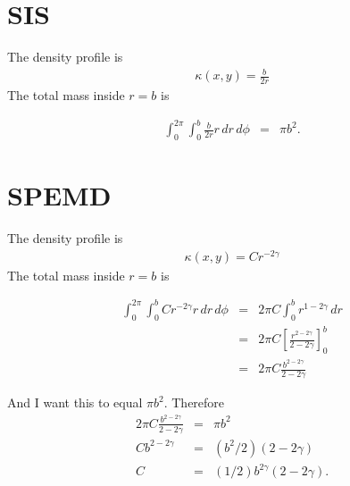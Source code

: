 \documentclass[a4paper, 11pt]{article}
\title{}
\author{}
\begin{document}

\section*{SIS}

The density profile is
\begin{eqnarray}
\kappa(x, y) = \frac{b}{2r}
\end{eqnarray}
The total mass inside $r=b$ is

\begin{eqnarray}
\int_0^{2\pi}\int_0^b \frac{b}{2r} r \, dr \, d\phi
&=& \pi b^2.
\end{eqnarray}

\section*{SPEMD}
The density profile is
\begin{eqnarray}
\kappa(x, y) = Cr^{-2\gamma}
\end{eqnarray}
The total mass inside $r=b$ is

\begin{eqnarray}
\int_0^{2\pi}\int_0^b Cr^{-2\gamma} r \, dr \, d\phi
&=& 2\pi C \int_0^b r^{1-2\gamma} \, dr\\
&=& 2\pi C \left[\frac{r^{2-2\gamma}}{2-2\gamma}\right]_0^b\\
&=& 2\pi C \frac{b^{2-2\gamma}}{2-2\gamma}
\end{eqnarray}

And I want this to equal $\pi b^2$. Therefore
\begin{eqnarray}
2\pi C \frac{b^{2-2\gamma}}{2-2\gamma} &=& \pi b^2\\
C b^{2-2\gamma} &=& (b^2/2)(2-2\gamma)\\
C &=& (1/2)b^{2\gamma}(2 - 2\gamma).
\end{eqnarray}
\end{document}
